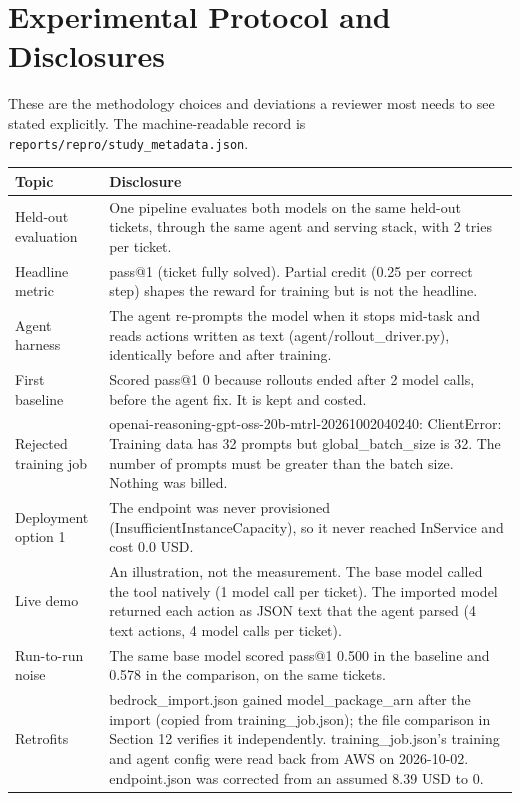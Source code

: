 \documentclass[11pt]{article}
\begin{document}
\section{Experimental Protocol and Disclosures}
These are the methodology choices and deviations a reviewer most needs to see stated explicitly. The
machine-readable record is \texttt{reports/repro/study\_metadata.json}.
\begin{center}
\begin{minipage}{\linewidth}\centering
\begin{tabular}{P{3.6cm}P{11.8cm}}
\toprule
\textbf{Topic} & \textbf{Disclosure} \\
\midrule
Held-out evaluation & One pipeline evaluates both models on the same held-out tickets, through the same agent and serving stack, with 2 tries per ticket. \\
Headline metric & pass@1 (ticket fully solved). Partial credit (0.25 per correct step) shapes the reward for training but is not the headline. \\
Agent harness & The agent re-prompts the model when it stops mid-task and reads actions written as text (agent/rollout\_driver.py), identically before and after training. \\
First baseline & Scored pass@1 0 because rollouts ended after 2 model calls, before the agent fix. It is kept and costed. \\
Rejected training job & openai-reasoning-gpt-oss-20b-mtrl-20261002040240: ClientError: Training data has 32 prompts but global\_batch\_size is 32. The number of prompts must be greater than the batch size. Nothing was billed. \\
Deployment option 1 & The endpoint was never provisioned (InsufficientInstanceCapacity), so it never reached InService and cost 0.0 USD. \\
Live demo & An illustration, not the measurement. The base model called the tool natively (1 model call per ticket). The imported model returned each action as JSON text that the agent parsed (4 text actions, 4 model calls per ticket). \\
Run-to-run noise & The same base model scored pass@1 0.500 in the baseline and 0.578 in the comparison, on the same tickets. \\
Retrofits & bedrock\_import.json gained model\_package\_arn after the import (copied from training\_job.json); the file comparison in Section 12 verifies it independently. training\_job.json's training and agent config were read back from AWS on 2026-10-02. endpoint.json was corrected from an assumed 8.39 USD to 0. \\
\bottomrule
\end{tabular}
\end{minipage}
\end{center}
\end{document}
